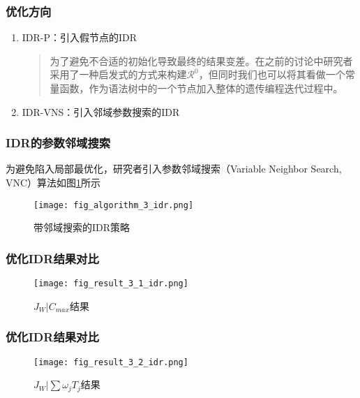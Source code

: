 \begin{frame}
    \frametitle{优化方向}
    \begin{enumerate}
        \item IDR-P：引入假节点的IDR    
        \begin{quote}
            为了避免不合适的初始化导致最终的结果变差。在之前的讨论中研究者采用了一种启发式的方式来构建$\mathcal{R}^0$，但同时我们也可以将其看做一个常量函数，作为语法树中的一个节点加入整体的遗传编程迭代过程中。
        \end{quote}
        \item IDR-VNS：引入邻域参数搜索的IDR
    \end{enumerate}

\end{frame}
\begin{frame}
    \frametitle{IDR的参数邻域搜索}
    为避免陷入局部最优化，研究者引入参数邻域搜索（Variable Neighbor Search, VNC）算法如图\ref{fig:vns_idr}所示
    \begin{figure}[H]
        \centering
        \texttt{[image: fig\_algorithm\_3\_idr.png]}
        \caption{带邻域搜索的IDR策略}
        \label{fig:vns_idr}
    \end{figure}
\end{frame}
\begin{frame}
    \frametitle{优化IDR结果对比}

    \begin{figure}[H]
        \centering
        \texttt{[image: fig\_result\_3\_1\_idr.png]}
        \caption{$J_W|C_{max}$结果}
        \label{fig:result_enhanced_1}
    \end{figure}
\end{frame}

\begin{frame}
    \frametitle{优化IDR结果对比}
    \begin{figure}[H]
        \centering
        \texttt{[image: fig\_result\_3\_2\_idr.png]}
        \caption{$J_W|\sum \omega_jT_j$结果}
        \label{fig:result_enhanced_2}
    \end{figure}
\end{frame}